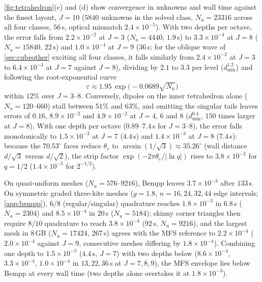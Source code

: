 \autoref{fig:tetrahedron}(c) and (d) show convergence in unknowns and wall time against the finest layout, $J = 10$ ($5840$ unknowns in the solved class, $N_u = 23316$ across all four classes, $56$\,s, optical mismatch $2.4\times10^{-5}$). With two depths per octave, the error falls from $2.2\times10^{-2}$ at $J = 3$ ($N_u = 4440$, $1.9$\,s) to $3.3\times10^{-4}$ at $J = 8$ ($N_u = 15840$, $22$\,s) and $1.0\times10^{-4}$ at $J = 9$ ($36$\,s; for the oblique wave of \autoref{sec:cubeother} exciting all four classes, it falls similarly from $2.4\times10^{-2}$ at $J = 3$ to $6.4\times10^{-4}$ at $J = 7$ against $J = 8$), dividing by $2.1$ to $3.3$ per level ($d_{\min}^{1.2}$) and following the root-exponential curve
\begin{equation}
  \varepsilon \approx 1.95\,\exp\bigl(-0.0689\sqrt{N_u}\bigr)
  \label{eq:tetrootexp}
\end{equation}
within $12\%$ over $J = 3\text{--}8$. Conversely, dipoles on the inner tetrahedron alone ($N_u = 120\text{--}660$) stall between $51\%$ and $63\%$, and omitting the singular tails leaves errors of $0.16$, $8.9\times10^{-2}$ and $4.9\times10^{-2}$ at $J = 4$, $6$ and $8$ ($d_{\min}^{0.4}$, $150$ times larger at $J = 8$). With one depth per octave ($0.89\text{--}7.4$\,s for $J = 3\text{--}8$), the error falls monotonically to $1.5\times10^{-3}$ at $J = 7$ ($4.4$\,s) and $1.4\times10^{-3}$ at $J = 8$ ($7.4$\,s): because the $70.53^\circ$ faces reduce $\theta_e$ to $\arcsin(1/\sqrt{3})\approx 35.26^\circ$ (wall distance $d/\sqrt{3}$ versus $d/\sqrt{2}$), the strip factor $\exp(-2\pi\theta_e/|\ln q|)$ rises to $3.8\times10^{-3}$ for $q = 1/2$ ($1.4\times10^{-5}$ for $2^{-1/2}$).

On quasi-uniform meshes ($N_u = 576\text{--}9216$), Bempp leaves $3.7\times10^{-3}$ after $133$\,s. On symmetric graded three-kite meshes ($g = 1.8$, $n = 16,24,32,44$ edge intervals; \ref{app:bempp}), $6/8$ (regular/singular) quadrature reaches $1.8\times10^{-3}$ in $6.8$\,s ($N_u = 2304$) and $8.5\times10^{-4}$ in $20$\,s ($N_u = 5184$); skinny corner triangles then require $8/10$ quadrature to reach $3.8\times10^{-4}$ ($92$\,s, $N_u = 9216$), and the largest mesh in $8$\,GB ($N_u = 17424$, $267$\,s) agrees with the MFS reference to $2.2\times10^{-4}$ ($2.0\times10^{-4}$ against $J = 9$, consecutive meshes differing by $1.8\times10^{-4}$). Combining one depth to $1.5\times10^{-3}$ ($4.4$\,s, $J = 7$) with two depths below ($8.6\times10^{-4}$, $3.3\times10^{-4}$, $1.0\times10^{-4}$ in $13,22,36$\,s at $J = 7,8,9$), the MFS envelope lies below Bempp at every wall time (two depths alone overtakes it at $1.8\times10^{-3}$).

